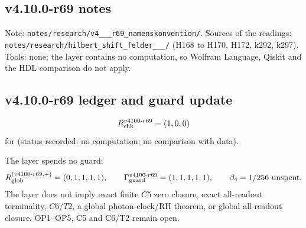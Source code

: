 \subsection*{v4.10.0-r69 notes}
\label{subsec:v4100-r69-notes}

{\raggedright
Note: \texttt{notes/\allowbreak research/\allowbreak v4\_\_\_\allowbreak r69\_\allowbreak namenskonvention/}.
Sources of the readings: \texttt{notes/\allowbreak research/\allowbreak hilbert\_\allowbreak shift\_\allowbreak felder\_\_\_/}
(H168 to H170, H172, k292, k297).
Tools: none; the layer contains no computation, so Wolfram Language, Qiskit and the HDL comparison do not apply.
\par}

\subsection*{v4.10.0-r69 ledger and guard update}
\label{subsec:v4100-r69-ledger-guard}

\[
R_{\rm chk}^{v4100\text{-}r69}=(1,0,0)
\]
for (status recorded; no computation; no comparison with data).

The layer spends no guard:
\[
R_{\rm glob}^{(v4100\text{-}r69,+)}=(0,1,1,1,1),
\qquad
\Gamma_{\rm guard}^{v4100\text{-}r69}=(1,1,1,1,1),
\qquad
\beta_4=1/256\ \text{unspent}.
\]
The layer does not imply exact finite \(C5\) zero closure, exact all-readout terminality, \(C6/T2\), a global photon-clock/RH theorem,
or global all-readout closure.  OP1--OP5, C5 and C6/T2 remain open.
